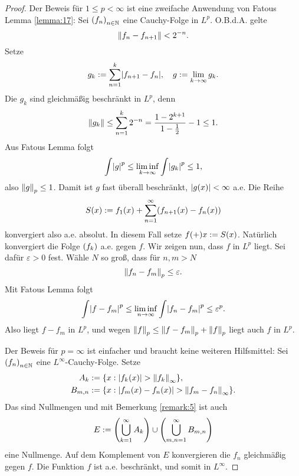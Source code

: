 \begin{proof}
	Der Beweis für \(1 \le p < \infty\) ist eine zweifache Anwendung von Fatous Lemma \ref{lemma:17}:
	Sei \(\parentheses*{f_n}_{n \in \N}\) eine Cauchy-Folge in \(L^p\).
	O.B.d.A. gelte
	\begin{equation}
		\norm*{f_n - f_{n + 1}} < 2^{-n}.
	\end{equation}
	Setze
	\begin{equation}
		g_k := \sum_{n = 1}^k \absolute*{f_{n + 1} - f_n}, \quad g := \lim_{k \to \infty}g_k.
	\end{equation}
	Die \(g_k\) sind gleichmäßig beschränkt in \(L^p\), denn
	\begin{equation}
		\norm*{g_k} \le \sum_{n = 1}^k 2^{-n} = \frac{1 - 2^{k + 1}}{1 - \frac{1}{2}} - 1 \le 1.
	\end{equation}
	Aus Fatous Lemma folgt
	\[
		\int\absolute*{g}^p \le \liminf_{k \to \infty}\int\absolute*{g_k}^p \le 1,
	\]
	also \(\norm*{g}_p \le 1\).
	Damit ist \(g\) fast überall beschränkt, \(\absolute*{g\parentheses*{x}} < \infty\) a.e.
	Die Reihe
	\begin{equation}
		S\parentheses*{x} := f_1\parentheses*{x} + \sum_{n = 1}^\infty \parentheses*{f_{n + 1}\parentheses*{x} - f_n\parentheses*{x}}
	\end{equation}
	konvergiert also a.e. absolut.
	In diesem Fall setze \(f\parentheses+{x} := S\parentheses*{x}\).
	Natürlich konvergiert die Folge \(\parentheses*{f_k}\) a.e. gegen \(f\).
	Wir zeigen nun, dass \(f\) in \(L^p\) liegt.
	Sei dafür \(\varepsilon > 0\) fest.
	Wähle \(N\) so groß, dass für \(n, m > N\)
	\[
		\norm*{f_n - f_m}_p \le \varepsilon.
	\]
	Mit Fatous Lemma folgt
	\[
		\int\absolute*{f - f_m}^p \le \liminf_{n \to \infty}\int\absolute*{f_n - f_m}^p \le \varepsilon^p.
	\]
	Also liegt \(f - f_m\) in \(L^p\), und wegen \(\norm*{f}_p \le \norm*{f - f_m}_p + \norm*{f}_p\) liegt auch \(f\) in \(L^p\).

	Der Beweis für \(p = \infty\) ist einfacher und braucht keine weiteren Hilfsmittel:
	Sei \(\parentheses*{f_n}_{n \in \N}\) eine \(L^\infty\)-Cauchy-Folge.
	Setze
	\begin{align*}
		A_k &:= \braces*{x : \absolute*{f_k\parentheses*{x}} > \norm*{f_k}_\infty},\\
		B_{m, n} &:= \braces*{x : \absolute*{f_m\parentheses*{x} - f_n\parentheses*{x}} > \norm*{f_m - f_n}_\infty}.
	\end{align*}
	Das sind Nullmengen und mit Bemerkung \ref{remark:5} ist auch
	\[
		E := \parentheses*{\bigcup_{k = 1}^\infty A_k} \cup \parentheses*{\bigcup_{m, n = 1}^\infty B_{m, n}}
	\]
	eine Nullmenge.
	Auf dem Komplement von \(E\) konvergieren die \(f_n\) gleichmäßig gegen \(f\).
	Die Funktion \(f\) ist a.e. beschränkt, und somit in \(L^\infty\).
\end{proof}
